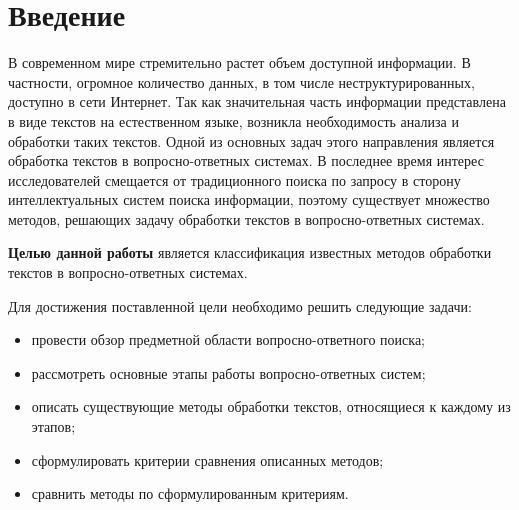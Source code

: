 \chapter*{Введение}

В современном мире стремительно растет объем доступной информации. В частности, огромное количество данных, в том числе неструктурированных, доступно в сети Интернет.  Так как значительная часть информации представлена в виде текстов на естественном языке, возникла необходимость анализа и обработки таких текстов. Одной из основных задач этого направления является обработка текстов в вопросно-ответных системах. В последнее время интерес исследователей смещается от традиционного поиска по запросу в сторону интеллектуальных систем поиска информации, поэтому существует множество методов, решающих задачу обработки текстов в вопросно-ответных системах.

\textbf{Целью данной работы} является классификация известных методов обработки текстов в вопросно-ответных системах.

Для достижения поставленной цели необходимо решить следующие задачи:
\begin{itemize}[label=---]
	\item провести обзор предметной области вопросно-ответного поиска;
	\item рассмотреть основные этапы работы вопросно-ответных систем;
	\item описать существующие методы обработки текстов, относящиеся к каждому из этапов;
	\item сформулировать критерии сравнения описанных методов;
	\item сравнить методы по сформулированным критериям. 
\end{itemize}